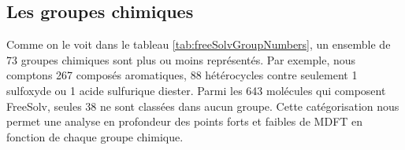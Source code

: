 \subsection{Les groupes chimiques}
Comme on le voit dans le tableau \ref{tab:freeSolvGroupNumbers}, un ensemble de 73 groupes chimiques sont plus ou moins représentés. Par exemple, nous comptons 267 composés aromatiques, 88 hétérocycles contre seulement 1 sulfoxyde ou 1 acide sulfurique diester. Parmi les 643 molécules qui composent FreeSolv, seules 38 ne sont classées dans aucun groupe. Cette catégorisation nous permet une analyse en profondeur des points forts et faibles de MDFT en fonction de chaque groupe chimique.









